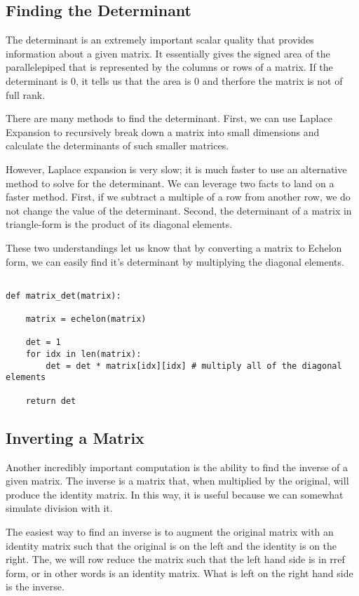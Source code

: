 \documentclass[12pt, a4paper]{article}
\begin{document}
\subsection{Finding the Determinant}

The determinant is an extremely important scalar quality that provides information about a given matrix. 
It essentially gives the signed area of the parallelepiped that is represented by the columns or rows of a matrix. 
If the determinant is 0, it tells us that the area is 0 and therfore the matrix is not of full rank.

There are many methods to find the determinant. First, we can use Laplace Expansion to recursively break down a matrix into small dimensions
and calculate the determinants of such smaller matrices. 

However, Laplace expansion is very slow; it is much faster to use an alternative method to solve for the determinant. 
We can leverage two facts to land on a faster method. First, if we subtract a multiple of a row from another row, 
we do not change the value of the determinant. Second, the determinant of a matrix in triangle-form is the product of its diagonal elements. 

These two understandings let us know that by converting a matrix to Echelon form, we can easily find it's determinant by multiplying the diagonal elements.

\begin{lstlisting}

def matrix_det(matrix):

    matrix = echelon(matrix)

    det = 1
    for idx in len(matrix):
        det = det * matrix[idx][idx] # multiply all of the diagonal elements

    return det

\end{lstlisting}


\subsection{Inverting a Matrix}

Another incredibly important computation is the ability to find the inverse of a given matrix. The inverse is a matrix that, when multiplied by the original, will produce the 
identity matrix. In this way, it is useful because we can somewhat simulate division with it. 

The easiest way to find an inverse is to augment the original matrix with an identity matrix such that the original is on the left and the identity is on the right. 
The, we will row reduce the matrix such that the left hand side is in rref form, or in other words is an identity matrix. What is left on the right hand side is the inverse. 
\end{document}
